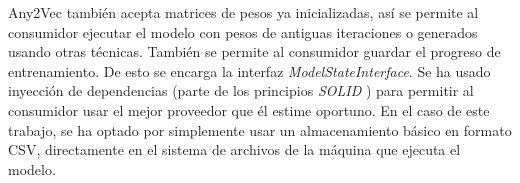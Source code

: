 Any2Vec también acepta matrices de pesos ya inicializadas, así se permite al consumidor ejecutar el modelo con pesos de antiguas iteraciones o generados usando otras técnicas. También se permite
al consumidor guardar el progreso de entrenamiento. De esto se encarga la interfaz \textit{ModelStateInterface}. Se ha usado inyección de dependencias (parte de los principios \textit{SOLID} \cite{martin2000design})
para permitir al consumidor usar el mejor proveedor que él estime oportuno. En el caso de este trabajo, se ha optado por simplemente usar un almacenamiento básico en formato CSV, directamente en el sistema de
archivos de la máquina que ejecuta el modelo.

